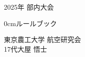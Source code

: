 





% 

\begin{center}
		{\Large
		2025年 部内大会
		}
	\end{center}
	\begin{center}
		\vspace*{100truept}
		{\fontsize{22pt} {0cm}\selectfont ルールブック}\\ %
		\vspace{30truept}
	\end{center}
	\begin{center}
		\vspace{170truept}	
		\vspace{15truept}	
		{\LARGE 東京農工大学 }
		{\LARGE 航空研究会}\\ 
		\vspace{15truept}
		{\LARGE 17代\hspace{5mm}大屋 悟士}\\ %
		\vspace{50truept}
		\vspace{20truept}
	\end{center}
% 
